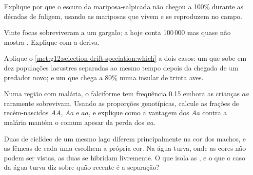 \begin{exercise}[$\star\star$]\label{exo:g12:selection-drift-speciation:9}
Explique por que o  escuro da mariposa-salpicada não chegou a
100\% durante as décadas de fuligem, usando as mariposas que vivem e se
reproduzem no campo.
\end{exercise}

\begin{exercise}[$\star\star$]\label{exo:g12:selection-drift-speciation:10}
Vinte focas sobreviveram a um gargalo; a  hoje conta 100\,000
mas quase não mostra . Explique com a deriva.
\end{exercise}

\begin{exercise}[$\star\star$]\label{exo:g12:selection-drift-speciation:11}
Aplique o \cref{met:g12:selection-drift-speciation:which} a dois casos:
um  que sobe em dez populações lacustres separadas ao mesmo tempo
depois da chegada de um predador novo; e um  que chega a 80\% numa
 insular de trinta aves.
\end{exercise}

\begin{exercise}[$\star\star\star$]\label{exo:g12:selection-drift-speciation:12}
Numa região com malária, o  falciforme tem frequência 0.15 embora
as crianças $aa$ raramente sobrevivam. Usando as proporções
genotípicas, calcule as frações de recém-nascidos $AA$, $Aa$ e $aa$, e
explique como a vantagem dos $Aa$ contra a malária mantém o  comum
apesar da perda dos $aa$.
\end{exercise}

\begin{exercise}[$\star\star\star$]\label{exo:g12:selection-drift-speciation:13}
Duas  de ciclídeo de um mesmo lago diferem principalmente na
cor dos machos, e as fêmeas de cada uma escolhem a própria cor. Na água
turva, onde as cores não podem ser vistas, as duas se hibridam
livremente. O que isola as , e o que o caso da água turva diz
sobre quão recente é a separação?
\end{exercise}

